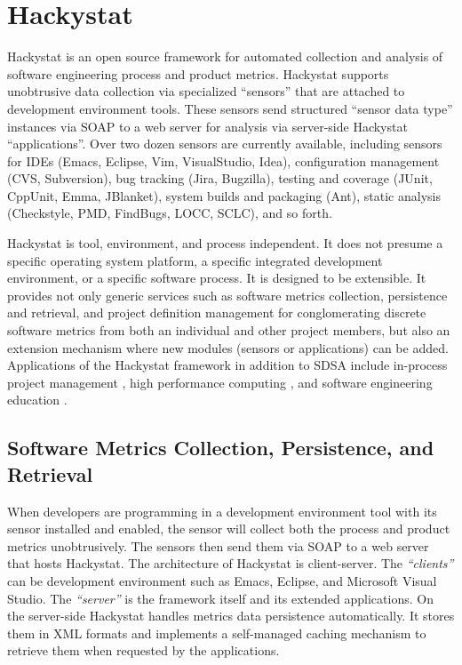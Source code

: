 \section{Hackystat}
Hackystat is an open source framework for automated collection and analysis
of software engineering process and product metrics. Hackystat supports 
unobtrusive data collection via specialized ``sensors'' that are attached 
to development environment tools. These sensors send structured ``sensor 
data type'' instances via SOAP to a web server for analysis via server-side 
Hackystat ``applications''. Over two dozen sensors are currently available, 
including sensors for IDEs (Emacs, Eclipse, Vim, VisualStudio, Idea), 
configuration management (CVS, Subversion), bug tracking (Jira, Bugzilla), 
testing and coverage (JUnit, CppUnit, Emma, JBlanket), 
system builds and packaging (Ant), 
static analysis (Checkstyle, PMD, FindBugs, LOCC, SCLC), and so forth.

Hackystat is tool, environment, and process independent. It does not 
presume a specific operating system platform, a specific integrated 
development environment, or a specific software process. It is designed
to be extensible. It provides not only generic services such as 
software metrics collection, persistence and retrieval, and project 
definition management for conglomerating discrete software metrics 
from both an individual and other project members, but also an 
extension mechanism where new modules (sensors or applications) 
can be added. Applications of the Hackystat framework in addition 
to SDSA include in-process project management \cite{csdl2-04-11}, high 
performance computing \cite{csdl2-04-22}, and software engineering
education \cite{csdl2-03-12}.

\subsection{Software Metrics Collection, Persistence, and Retrieval}
When developers are programming in a development environment tool with
its sensor installed and enabled, the sensor will collect both
the process and product metrics unobtrusively. The sensors then send
them via SOAP to a web server that hosts Hackystat.
The architecture of Hackystat is client-server. The \textit{``clients''} 
can be development environment such as Emacs, Eclipse, 
and Microsoft Visual Studio. The \textit{``server''} is the 
framework itself and its extended applications. On the server-side
Hackystat handles metrics data persistence automatically. It stores 
them in XML formats and implements a self-managed caching mechanism 
to retrieve them when requested by the applications. 

